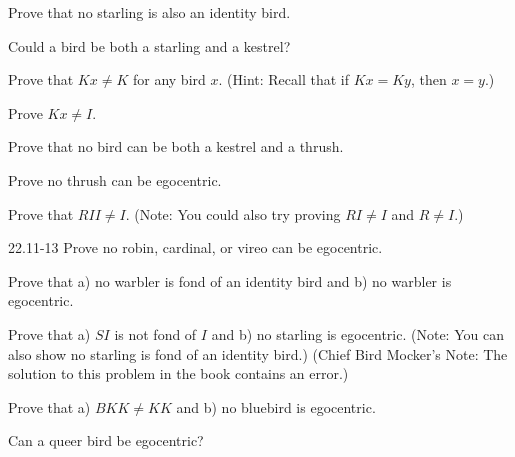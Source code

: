 \documentclass[12pt, letterpaper]{article}
\begin{document}
\begin{prob}{22.4}  
Prove that no starling is also an identity bird.
\end{prob}

\begin{prob}{22.5}  
Could a bird be both a starling and a kestrel?
\end{prob}

\begin{prob}{22.6}  
Prove that $Kx \neq K$ for any bird $x$. (Hint: Recall that if $Kx = Ky$, then $x = y$.)
\end{prob}

\begin{prob}{22.7}  
Prove $Kx \neq I$.
\end{prob}

\begin{prob}{22.8}  
Prove that no bird can be both a kestrel and a thrush.
\end{prob}

\begin{prob}{22.9}  
Prove no thrush can be egocentric.
\end{prob}

\begin{prob}{22.10} 
Prove that $RII \neq I$. (Note: You could also try proving $RI \neq I$ and $R \neq I$.)
\end{prob}

\begin{prob}{22.11-13} 
Prove no robin, cardinal, or vireo can be egocentric.
\end{prob}

\begin{prob}{22.14} 
Prove that a) no warbler is fond of an identity bird and b) no warbler is egocentric.
\end{prob}

\begin{prob}{22.15}
Prove that a) $SI$ is not fond of $I$ and b) no starling is egocentric. (Note: You can also show no starling is fond of an identity bird.) (Chief Bird Mocker's Note: The solution to this problem in the book contains an error.)
\end{prob}

\begin{prob}{22.16} 
Prove that a) $BKK \neq KK$ and b) no bluebird is egocentric.
\end{prob}

\begin{prob}{22.17} 
Can a queer bird be egocentric?
\end{prob}
\end{document}
